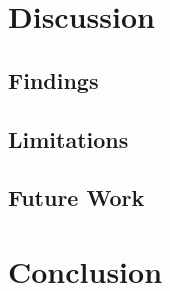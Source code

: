 \documentclass[12pt]{article}
\begin{document}
\clearpage
\section{Discussion}

\subsection{Findings}

\subsection{Limitations}

\subsection{Future Work}



\section{Conclusion} \label{conc}



{}

\end{document}
